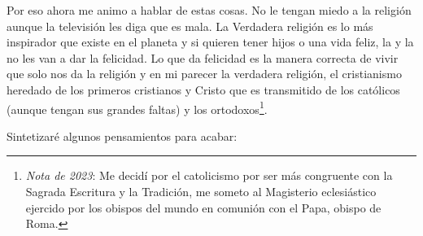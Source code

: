 \documentclass[12pt]{article}
\begin{document}
	Por eso ahora me animo a hablar de estas cosas. No le tengan miedo a la
	religión aunque la televisión les diga que es mala. La Verdadera
	religión es lo más inspirador que existe en el planeta y si quieren
	tener hijos o una vida feliz, la  y la
	 no les van a dar la felicidad. Lo que da
	felicidad es la manera correcta de vivir que solo nos da la religión y
	en mi parecer la verdadera religión, el cristianismo heredado de los
	primeros cristianos y Cristo que es transmitido de los católicos (aunque
	tengan sus grandes faltas) y los
	ortodoxos\footnote{\textit{Nota de 2023}: Me decidí por el
	catolicismo por ser más congruente con la Sagrada Escritura y la
	Tradición, me someto al Magisterio eclesiástico ejercido por los obispos
	del mundo en comunión con el Papa, obispo de Roma.}.
	
	Sintetizaré algunos pensamientos para acabar:
\end{document}
